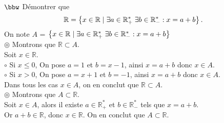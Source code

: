 \documentclass[11pt]{article}
\begin{document}
\begin{exercice}{$\bbw$}{}
    Démontrer que
    \begin{equation*}
        \mathbb{R} = \left\lbrace{x \in \mathbb{R} \hspace{0.1cm} | \hspace{0.1cm} \exists a \in \mathbb{R}^*_+ \hspace{0.1cm} \exists b \in \mathbb{R}^*_- : x = a + b}\right\rbrace.
    \end{equation*}
    \tcblower
    On note $A$ = $\left\lbrace{x \in \mathbb{R} \hspace{0.1cm} | \hspace{0.1cm} \exists a \in \mathbb{R}^*_+ \hspace{0.1cm} \exists b \in \mathbb{R}^*_- : x = a + b}\right\rbrace$\\
    $\circledcirc$ Montrons que $\mathbb{R} \subset A$.\\
    Soit $x \in \mathbb{R}$.\\
    $\circ$ Si $x \leq 0$, On pose $a=1$ et $b=x-1$, ainsi $x = a + b$ donc $x \in A$.\\
    $\circ$ Si $x > 0$, On pose $a=x+1$ et $b=-1$, ainsi $x = a + b$ donc $x \in A$.\\
    Dans tous les cas $x \in A$, on en conclut que $\mathbb{R} \subset A$.\\
    $\circledcirc$ Montrons que $A \subset \mathbb{R}$.\\
    Soit $x \in A$, alors il existe $a \in \mathbb{R}^*_+$ et $b \in \mathbb{R}^*_-$ tels que $x = a + b$.\\
    Or $a + b \in \mathbb{R}$, donc $x \in \mathbb{R}$. On en conclut que $A \subset \mathbb{R}$.
\end{exercice}
\end{document}
